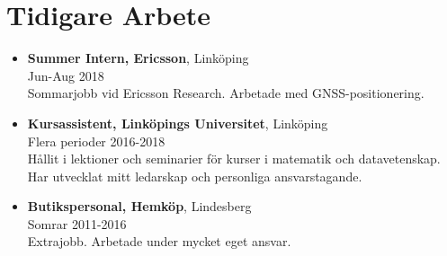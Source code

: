 \documentclass[12pt]{article}
\newcommand{\text}[2]{#2}
\newcommand{\text}[2]{#1}
\begin{document}
\section*{\text{Previous Work}{Tidigare Arbete}}
\begin{itemize}
    \item \textbf{Summer Intern, Ericsson}, Linköping\\
        Jun-Aug 2018\\
        \text{
            Summer internship at Ericsson Research. Worked with GNSS positioning.
        }{
            Sommarjobb vid Ericsson Research. Arbetade med GNSS-positionering.
        }

    \item \textbf{\text{Course Assistant, Linköping University}{Kursassistent, Linköpings Universitet}}, Linköping\\
        \text{Multiple periods}{Flera perioder} 2016-2018\\
        \text{
            In charge of lessons and seminars for courses in mathematics and computer science. Developed my leadership skills and personal responsibility.
        }{
            Hållit i lektioner och seminarier för kurser i matematik och datavetenskap. Har utvecklat mitt ledarskap och personliga ansvarstagande.
        }

    \item \textbf{\text{Store Clerk}{Butikspersonal}, Hemköp}, Lindesberg\\
        \text{Summers}{Somrar} 2011-2016\\
        \text{
            Extra job. Worked under a lot of individual responsibility.
        }{
            Extrajobb. Arbetade under mycket eget ansvar.
        }

\end{itemize}
\end{document}
